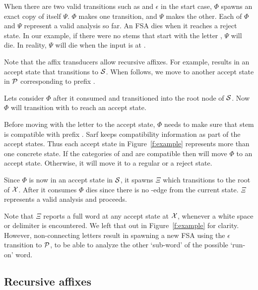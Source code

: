 \documentclass[a4,12pt]{report}
\newcommand{\noTrRL}[1]{\transfalse\RL{#1}\transtrue}
\newcommand{\noTrnoVocRL}[1]{\transfalse\novocalize\noTrRL{#1}\vocalize\transtrue}
\begin{document}
When there are two valid transitions such as \noTrnoVocRL{w} 
and $\epsilon$ in the start case, 
$\Phi$ spawns an exact copy of itself $\Psi$. 
$\Phi$ makes one transition, and $\Psi$ makes the other. 
Each of $\Phi$ and $\Psi$ represent a valid analysis so far. 
An FSA %
dies when it reaches a reject state.
In our example, if there were no stems that start 
with the letter \noTrnoVocRL{w}, $\Psi$ will die. 
In reality, $\Psi$ will die when the input 
is at \noTrnoVocRL{wsyl`}. 

Note that the affix transducers allow recursive 
affixes. 
For example, \noTrnoVocRL{w} 
results 
in an accept state
that transitions to ${\cal S}$.
When \noTrnoVocRL{s} follows, we move to another accept state in 
${\cal P}$ corresponding to 
prefix \noTrnoVocRL{ws}. 

Lets consider $\Phi$ after it consumed \noTrnoVocRL{wsy} 
and transitioned into the root node of ${\cal S}$.
Now $\Phi$ will transition with \noTrnoVocRL{l`b} to reach an accept 
state. 

Before moving with the letter \noTrnoVocRL{b} to the accept state,
$\Phi$ needs to make sure that %
stem \noTrnoVocRL{l`b} is compatible
with %
prefix \noTrnoVocRL{wsy}. 
Sarf keeps compatibility information as part
of the accept states. 
Thus each accept state in Figure~\ref{f:example} represents
more than one concrete state. 
If the categories of \noTrnoVocRL{l`b} and \noTrnoVocRL{wsy} are compatible
then \noTrnoVocRL{b} will move $\Phi$ to an accept state. 
Otherwise, it will move it to a regular or a reject state. 
       
Since $\Phi$ is now in an accept state in ${\cal S}$, it 
spawns $\Xi$ which transitions to the root of ${\cal X}$. 
After it consumes \noTrnoVocRL{h--} $\Phi$ dies since there is no
\noTrnoVocRL{h--}-edge from the current state.
$\Xi$ represents a valid analysis and proceeds.
       
Note that $\Xi$ reports a full word at any accept state
at ${\cal X}$, whenever a white space or delimiter is encountered.
We left that out in Figure~\ref{f:example} for clarity. 
However, non-connecting letters result in spawning a new FSA 
using the $\epsilon$ transition
to ${\cal P}$, to be able to analyze the other `sub-word' of 
the possible `run-on' word.


\subsection{Recursive affixes}
\label{sec:recaffix}
\end{document}

